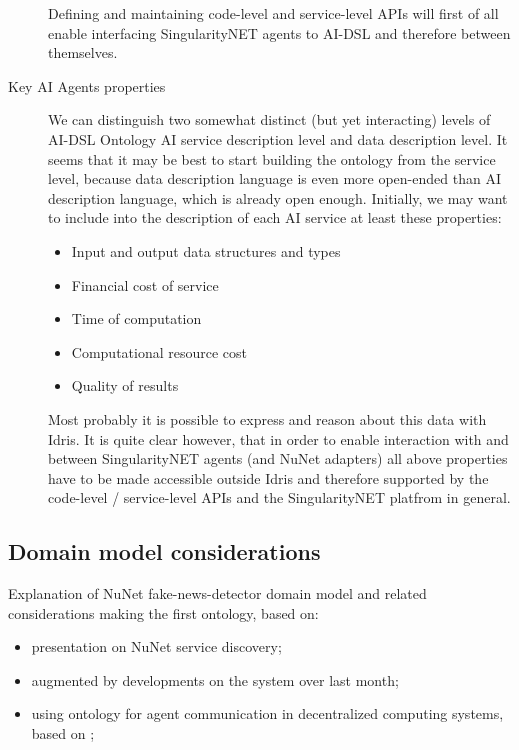 \documentclass[]{report}
\begin{document}
\begin{description}
  Defining and maintaining code-level and service-level APIs will first of all enable interfacing SingularityNET agents to AI-DSL and therefore between themselves.

  \item[Key AI Agents properties] We can distinguish two somewhat distinct (but yet interacting) levels of AI-DSL Ontology AI service description level and data description level. It seems that it may be best to start building the ontology from the service level, because data description language is even more open-ended than AI description language, which is already open enough. Initially, we may want to include into the description of each AI service at least these properties:
  \begin{itemize}
    \item Input and output data structures and types
    \item Financial cost of service
    \item Time of computation
    \item Computational resource cost
    \item Quality of results
  \end{itemize}
  Most probably it is possible to express and reason about this data with Idris. It is quite clear however, that in order to enable interaction with and between SingularityNET agents (and NuNet adapters) all above properties have to be made accessible outside Idris and therefore supported by the code-level / service-level APIs and the SingularityNET platfrom in general.

\end{description}

\subsection{Domain model considerations}

Explanation of NuNet fake-news-detector domain model and related considerations  making the first ontology, based on:
\begin{itemize}
	\item presentation on NuNet service discovery;
	\item augmented by developments on the system over last month;
	\item using ontology for agent communication in decentralized computing systems, based on \cite{YvesHellenschmidt2002};
\end{itemize}
\end{document}
